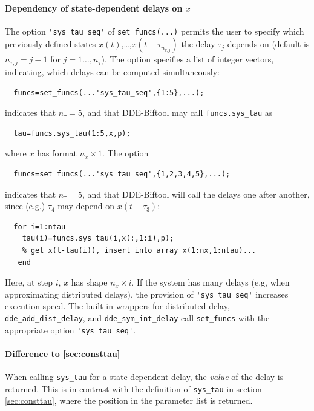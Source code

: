 \documentclass[10pt]{scrartcl}
\newcommand{\blist}[1]{\mbox{\lstinline!#1!}}
\begin{document}
\paragraph{Dependency of  state-dependent delays on $x$}
The option \blist{'sys_tau_seq'} of
\blist{set_funcs(...)} permits the user to specify which previously
defined states $x(t)$,\ldots,$x(t-\tau_{n_{\tau,j}})$ the delay $\tau_j$ depends on (default is $n_{\tau,j}=j-1$ for
$j=1\ldots,n_\tau$). The option specifies a list of integer vectors, indicating, which delays can be computed simultaneously:
\begin{lstlisting}
  funcs=set_funcs(...'sys_tau_seq',{1:5},...);
\end{lstlisting}
indicates that $n_\tau=5$, and that DDE-Biftool may call \blist{funcs.sys_tau} as
\begin{lstlisting}
  tau=funcs.sys_tau(1:5,x,p);
\end{lstlisting}
where $x$ has format $n_x\times1$. The option
\begin{lstlisting}
  funcs=set_funcs(...'sys_tau_seq',{1,2,3,4,5},...);
\end{lstlisting}
indicates that $n_\tau=5$, and that DDE-Biftool will call the delays one after another, since (e.g.) $\tau_4$ may depend on $x(t-\tau_3)$:
\begin{lstlisting}
  for i=1:ntau
    tau(i)=funcs.sys_tau(i,x(:,1:i),p);
    % get x(t-tau(i)), insert into array x(1:nx,1:ntau)...
   end
\end{lstlisting}
Here, at step $i$, $x$ has shape $n_x\times i$. If the system has
many delays (e.g, when approximating distributed delays), the provision
of \blist{'sys_tau_seq'} increases execution speed. The built-in
wrappers for distributed delay, \blist{dde_add_dist_delay}, and
\blist{dde_sym_int_delay} call \blist{set_funcs} with the appropriate
option \blist{'sys_tau_seq'}.


\paragraph{Difference to \cref{sec:consttau}} When calling
  \blist{sys_tau} for a state-dependent delay, the \emph{value} of the delay is
  returned.  This is in contrast with the definition of \blist{sys_tau}
  in section \ref{sec:consttau}, where the position in the parameter list
  is returned.


\end{document}
